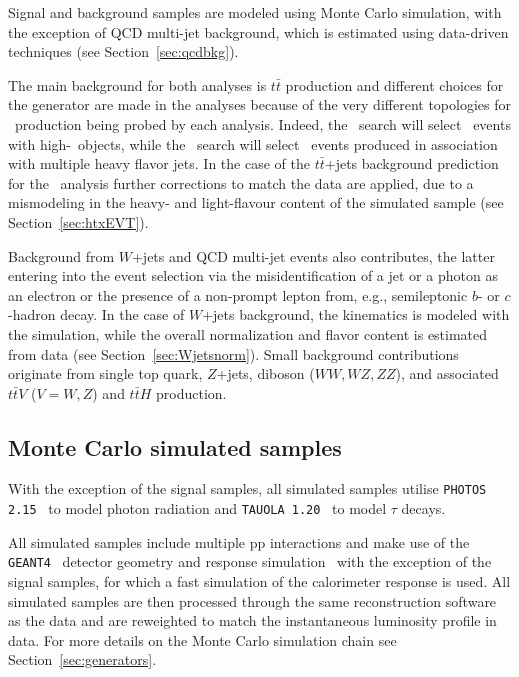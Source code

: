 Signal and background samples are 
modeled using Monte Carlo simulation, with the exception
of QCD multi-jet background, which is estimated 
using data-driven techniques (see Section~\ref{sec:qcdbkg}). 

The main background for both analyses is $t\bar{t}$ 
production %
and different choices for the generator are made
in the analyses because of the very different
topologies for \ttbar\ production being probed by
each analysis. Indeed, the \wbx\ search will select \ttbar\ events
with high-\pt\ objects, while the \htx\ search will
select \ttbar\ events produced in association with
multiple heavy flavor jets.
In the case of the $t\bar{t}$+jets background prediction for the \htx\ analysis 
further corrections to match the data are applied, due to a mismodeling in the
heavy- and light-flavour content of the simulated sample 
(see Section~\ref{sec:htxEVT}).

Background from $W$+jets 
and QCD multi-jet events also contributes, the latter
entering into the event selection via the misidentification 
of a jet or a photon as an
electron or the presence of a 
non-prompt lepton from, e.g., semileptonic $b$- or $c$-hadron decay.
In the case of $W$+jets background, the kinematics is modeled
with the simulation, while the overall normalization and flavor content
is estimated from data (see Section~\ref{sec:Wjetsnorm}).
Small background contributions originate from single top quark, $Z$+jets, diboson
($WW,WZ,ZZ$), and associated $t\bar{t}V$ ($V=W,Z$) and $t\bar{t}H$ production.

\subsection{Monte Carlo simulated samples}\label{sec:MCbkg}

With the exception of the 
signal samples, all simulated 
samples utilise {\tt PHOTOS 2.15}~\cite{PhotosPaper} to model
photon radiation and {\tt TAUOLA 1.20}~\cite{TauolaPaper} to model
$\tau$ decays.  

All simulated samples include multiple pp
interactions and make use of the  {\tt GEANT4}~\cite{geant}
detector geometry and response simulation~\cite{atlas_sim}
with the exception of the signal samples, for which a fast simulation of
the calorimeter response is used.
All simulated samples are then processed through the same reconstruction 
software as the data and are reweighted to match 
the instantaneous luminosity profile in data. For more details
on the Monte Carlo simulation chain see Section~\ref{sec:generators}.

